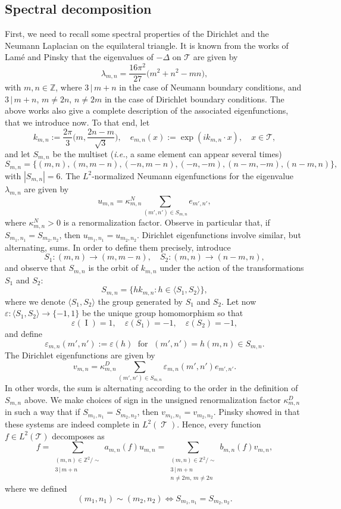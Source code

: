 \documentclass[a4paper,11pt]{amsart}
\numberwithin{equation}{section}
\theoremstyle{definition}
\DeclareMathOperator{\var}{\mathcal T}
\begin{document}
\subsection{Spectral decomposition}
First, we need to recall some spectral properties of the Dirichlet and the Neumann Laplacian on the equilateral triangle. It is known from the works of Lam\'e \cite{La} and Pinsky \cite{P2, P1} that the eigenvalues of $-\Delta$ on $\mathcal T$ are given by
\begin{equation}\label{eq:eigentri}
    \lambda_{m,n} = \frac{16 \pi^2}{27}\big(m^2 + n^2 - mn\big),
\end{equation}
with $m,n \in \mathbb Z$,
where $3\,|\,m+ n$ in the case of Neumann boundary conditions, and $3\,|\,m+ n$, $m\neq 2n$, $n\neq 2m$ in the case of Dirichlet boundary conditions.
The above works also give a complete description of the associated eigenfunctions, that we introduce now. To that end, let
$$
k_{m,n} := \frac{2\pi}{3}\bigg(m, \frac{2n - m}{\sqrt 3}\bigg), \quad
e_{m,n}(x) := \exp({i k_{m,n} \cdot x}),\quad x\in\mathcal T,
$$
and let $S_{m,n}$ be the multiset (\textit{i.e.}, a same element can appear several times)
$$
S_{m,n} = \big\{(m,n), (m, m-n), (-n, m-n), (-n, -m), (n - m, -m), (n-m, n)\big\},
$$
with $|S_{m,n}|=6$.
The $L^2$-normalized Neumann eigenfunctions for the eigenvalue $\lambda_{m,n}$ are given by 
$$
u_{m,n} = \kappa^N_{m,n} \sum_{(m',n')\in S_{m,n}} e_{m',n'},
$$
where $\kappa^{N}_{m,n} > 0$ is a renormalization factor. Observe in particular that, if $S_{m_1, n_1} = S_{m_2, n_2}$, then $u_{m_1, n_1} = u_{m_2, n_2}$.
Dirichlet eigenfunctions involve similar, but alternating, sums. In order to define them precisely, 
introduce
$$
S_1 : (m,n) \to (m, m-n), \quad S_2 : (m,n) \to (n-m, n),
$$
and observe that $S_{m,n}$ is the orbit of $k_{m,n}$ under the action of the transformations $S_1$ and $S_2$:
$$
S_{m,n} = \big\{ h k_{m,n} : h \in \langle S_1, S_2\rangle \big\},
$$
where we denote $\langle S_1, S_2 \rangle$ the group generated by $S_1$ and $S_2$. Let now $\varepsilon : \langle S_1, S_2\rangle \to \{ -1, 1 \}$ be the unique group homomorphism so that
$$
\varepsilon(\operatorname{I}) = 1, \quad \varepsilon(S_1) = -1,\quad \varepsilon(S_2) = -1,
$$
and define
$$
\varepsilon_{m,n}(m', n') := \varepsilon(h) \; \text{ for } \; (m', n') = h(m,n) \in S_{m,n}.
$$
The Dirichlet eigenfunctions are given by
$$
v_{m,n} = \kappa^D_{m,n} \sum_{(m',n')\in S_{m,n}} \varepsilon_{m,n}(m',n') e_{m',n'}.
$$
In other words, the sum is alternating according to the order in the definition of $S_{m,n}$ above. We make choices of sign in the unsigned renormalization factor $\kappa_{m,n}^D$ in such a way that if $S_{m_1, n_1} = S_{m_2, n_2}$, then $v_{m_1, n_1} = v_{m_2, n_2}$. 
Pinsky showed in \cite{P2} that these systems are indeed complete in $L^2(\var)$.
Hence, every function $f \in L^2(\mathcal T)$ decomposes as
\[
    f = \sum_{\substack{(m, n) \in \mathbb Z^2/\sim \\ 3 \,|\,m+n}}  a_{m,n}(f) u_{m,n} 
    = \sum_{\substack{(m, n) \in \mathbb Z^2/\sim \\ 3 \,|\,m+n \\ n\neq 2m,\, m\neq 2n}}  b_{m,n}(f) v_{m,n},
\]
where we defined
\[
    (m_1, n_1) \sim (m_2, n_2) \iff S_{m_1, n_1} = S_{m_2, n_2}.
\]
\end{document}
